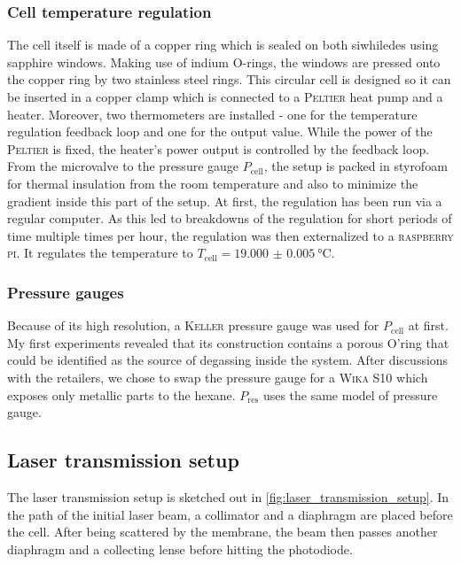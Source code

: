 \documentclass[../thesis.tex]{subfiles}
\begin{document}
        \subsubsection{Cell temperature regulation}
        \label{subsec:tcell-regulation}

          The cell itself is made of a copper ring which is sealed on both siwhiledes using sapphire windows. Making use of indium O-rings, the windows are pressed onto the copper ring by two stainless steel rings. This circular cell is designed so it can be inserted in a copper clamp which is connected to a \textsc{Peltier} heat pump and a heater. Moreover, two thermometers are installed - one for the temperature regulation feedback loop and one for the output value. While the power of the \textsc{Peltier} is fixed, the heater's power output is controlled by the feedback loop. From the microvalve to the pressure gauge $P_\mathrm{cell}$, the setup is packed in styrofoam for thermal insulation from the room temperature and also to minimize the gradient inside this part of the setup. At first, the regulation has been run via a regular computer. As this led to breakdowns of the regulation for short periods of time multiple times per hour,  the regulation was then externalized to a \textsc{raspberry pi}. It regulates the temperature to $T_\mathrm{cell}=\SI{19.000(5)}{\celsius}$.


        \subsubsection{Pressure gauges}

            Because of its high resolution, a \textsc{Keller} pressure gauge was used for $P_\mathrm{cell}$ at first. My first experiments revealed that its construction contains a porous O'ring that could be identified as the source of degassing inside the system. After discussions with the retailers, we chose to swap the pressure gauge for a \textsc{Wika} S10 which exposes only metallic parts to the hexane. $P_\mathrm{res}$ uses the same model of pressure gauge.


        \subsection{Laser transmission setup}
        \label{subsec:laser_transmission_setup}

          The laser transmission setup is sketched out in \cref{fig:laser_transmission_setup}. In the path of the initial laser beam, a collimator and a diaphragm are placed before the cell. After being scattered by the membrane, the beam then passes another diaphragm and a collecting lense before hitting the photodiode.
\end{document}
